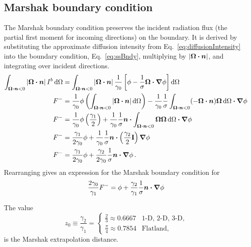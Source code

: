 \subsection{Marshak boundary condition}
The Marshak boundary condition \cite{Mar1947} preserves the incident radiation
flux (the partial first moment for incoming directions) on the boundary. It is
derived by substituting the approximate diffusion
intensity from Eq.~\eqref{eq:diffusionIntensity} into the boundary condition,
Eq.~\eqref{eq:ssBndy}, multiplying by $\left| \bm{\Omega}\bm{\cdot} \bm{n} \right|$, and integrating over
incident directions.
\begin{align*}
\int_{\bm{\Omega}\bm{\cdot} \bm{n} < 0 } \left| \bm{\Omega}\bm{\cdot} \bm{n} \right|
I^b \mathop{}\!\mathrm{d}\Omega
 &= 
\int_{\bm{\Omega}\bm{\cdot} \bm{n} < 0 } \left| \bm{\Omega}\bm{\cdot} \bm{n} \right| 
 \frac{1}{\gamma_0} \left[ \phi - \frac{1}{\sigma}
  \bm{\Omega} \bm{\cdot} \bm{\nabla} \phi \right]
  \mathop{}\!\mathrm{d}\Omega
\\
F^{-}
&= 
\frac{1}{\gamma_0} \phi \left( \int_{\bm{\Omega}\bm{\cdot} \bm{n} < 0 }
\left| \bm{\Omega}\bm{\cdot} \bm{n} \right| \mathop{}\!\mathrm{d}\Omega \right) 
  - \frac{1}{\gamma_0}\frac{1}{\sigma}
  \int_{\bm{\Omega}\bm{\cdot} \bm{n} < 0 } (-\bm{\Omega}\bm{\cdot} \bm{n})
  \bm{\Omega} \mathop{}\!\mathrm{d}\Omega  \bm{\cdot} \bm{\nabla} \phi
\\
F^{-}
&=
\frac{1}{\gamma_0} \phi \left( \frac{\gamma_1}{2} \right) 
  + \frac{1}{\gamma_0}\frac{1}{\sigma} \bm{n} \bm{\cdot}
  \int_{\bm{\Omega}\bm{\cdot} \bm{n} < 0 } \bm{\Omega} \bm{\Omega} \mathop{}\!\mathrm{d}\Omega
  \bm{\cdot} \bm{\nabla} \phi
\\
F^{-}
&=
\frac{\gamma_1}{2\gamma_0} \phi
+ \frac{1}{\gamma_0}\frac{1}{\sigma} \bm{n} \bm{\cdot} \left( \frac{\gamma_2}{2}
\mathbf{I} \right) \bm{\nabla} \phi
\\
F^{-}
&=
\frac{\gamma_1}{2\gamma_0} \phi
+ \frac{\gamma_2}{2\gamma_0}\frac{1}{\sigma} \bm{n} \bm{\cdot} \bm{\nabla} \phi\,.
\end{align*}
Rearranging gives an expression for the Marshak boundary condition for 
\begin{equation} \label{eq:marshak}
\frac{2\gamma_0}{\gamma_1} F^{-}
=
\phi + \frac{\gamma_2}{\gamma_1}\frac{1}{\sigma} \bm{n} \bm{\cdot} \bm{\nabla} \phi
\end{equation}

The value
\begin{equation*}
  z_0 \equiv \frac{\gamma_2}{\gamma_1}
  =
  \begin{cases}
    \frac{2}{3} \approx 0.6667 & \text{1-D, 2-D, 3-D,} \\
    \frac{\pi}{4} \approx 0.7854 & \text{Flatland,}
  \end{cases}
\end{equation*}
is the Marshak extrapolation distance.

